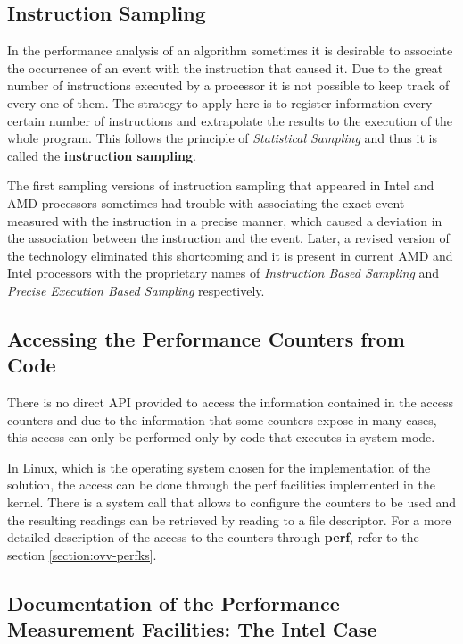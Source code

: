 \subsection{Instruction Sampling}\label{subsection:sampling}
In the performance analysis of an algorithm sometimes it is desirable to associate the occurrence of an event with the instruction that caused it. Due to the great number of instructions executed by a processor it is not possible to keep track of every one of them. The strategy to apply here is to register information every certain number of instructions and extrapolate the results to the execution of the whole program. This follows the principle of \textit{Statistical Sampling} and thus it is called the \textbf{instruction sampling}.

The first sampling versions of instruction sampling that appeared in Intel and AMD processors sometimes had trouble with associating the exact event measured with the instruction in a precise manner, which caused a deviation in the association between the instruction and the event. Later, a revised version of the technology eliminated this shortcoming and it is present in current AMD and Intel processors with the proprietary names of \textit{Instruction Based Sampling} \cite{amd-ibs} and \textit{Precise Execution Based Sampling}  respectively. 

\subsection{Accessing the Performance Counters from Code}\label{subsection:accessing-code}

There is no direct API provided to access the information contained in the access counters and due to the information that some counters expose in many cases, this access can only be performed only by code that executes in system mode.

In Linux, which is the operating system chosen for the implementation of the solution, the access can be done through the perf facilities implemented in the kernel. There is a system call that allows to configure the counters to be used and the resulting readings can be retrieved by reading to a file descriptor. For a more detailed description of the access to the counters through \textbf{perf}, refer to the section \ref{section:ovv-perfks}. 

\subsection{Documentation of the Performance Measurement Facilities: The Intel Case }\label{subsection:performance-documentation}

